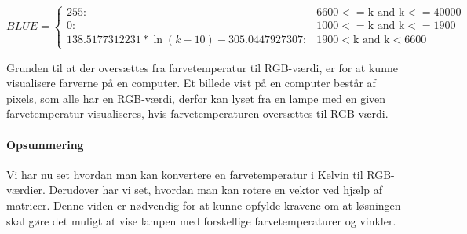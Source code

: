 \begin{displaymath}
   BLUE = \left\{
     \begin{array}{lr}
       255: & 6600 <= \text{k and k} <= 40000\\
       0: & 1000 <= \text{k and k} <= 1900\\
       138.5177312231 * \ln(k-10) - 305.0447927307: & 1900 < \text{k and k} < 6600
     \end{array}
   \right.
\end{displaymath} 

Grunden til at der oversættes fra farvetemperatur til RGB-værdi, er for at kunne visualisere farverne på en computer. Et billede vist på en computer består af pixels, som alle har en RGB-værdi, derfor kan lyset fra en lampe med en given farvetemperatur visualiseres, hvis farvetemperaturen oversættes til RGB-værdi.

\paragraph*{Opsummering}
Vi har nu set hvordan man kan konvertere en farvetemperatur i Kelvin til RGB-værdier. Derudover har vi set, hvordan man kan rotere en vektor ved hjælp af matricer. Denne viden er nødvendig for at kunne opfylde kravene om at løsningen skal gøre det muligt at vise lampen med forskellige farvetemperaturer og vinkler. 









